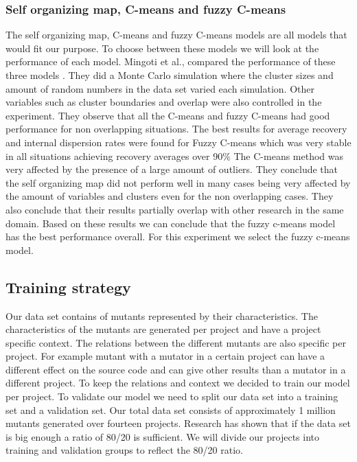\documentclass[../../main]{subfiles}
\begin{document}
\subsubsection{Self organizing map, C-means and fuzzy C-means}
The self organizing map, C-means and fuzzy C-means models are all models that would fit our purpose. 
To choose between these models we will look at the performance of each model.
Mingoti et al., compared the performance of these three models \cite{Mingoti2006ComparingAlgorithms}.
They did a Monte Carlo simulation where the cluster sizes and amount of random numbers in the data set varied each simulation\cite{Mingoti2006ComparingAlgorithms}.
Other variables such as cluster boundaries and overlap were also controlled in the experiment.
They observe that all the C-means and fuzzy C-means had good performance for non overlapping situations\cite{Mingoti2006ComparingAlgorithms}.
The best results for average recovery and internal dispersion rates were found for Fuzzy C-means which was very stable in all situations achieving recovery averages over 90\%\cite{Mingoti2006ComparingAlgorithms}
The C-means method was very affected by the presence of a large amount of outliers.
They conclude that the self organizing map did not perform well in many cases being very affected by the amount of variables and clusters even for the non overlapping cases\cite{Mingoti2006ComparingAlgorithms}.
They also conclude that their results partially overlap with other research in the same domain.
\newline
Based on these results we can conclude that the fuzzy c-means model has the best performance overall.
For this experiment we select the fuzzy c-means model.

\subsection{Training strategy}
Our data set contains of mutants represented by their characteristics. 
The characteristics of the mutants are generated per project and have a project specific context.
The relations between the different mutants are also specific per project.
For example mutant with a mutator in a certain project can have a different effect on the source code and can give other results than a mutator in a different project.
To keep the relations and context we decided to train our model per project.
\newline
To validate our model we need to split our data set into a training set and a validation set.
Our total data set consists of approximately 1 million mutants generated over fourteen projects.
Research has shown that if the data set is big enough a ratio of 80/20 is sufficient\cite{Guyon1997ARatio}.
We will divide our projects into training and validation groups to reflect the 80/20 ratio.
\end{document}
